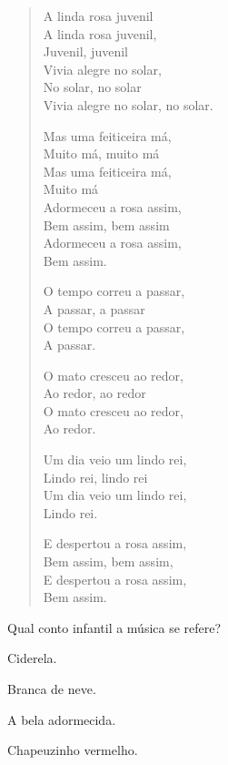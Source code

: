 \begin{verse}
A linda rosa juvenil\\
A linda rosa juvenil,\\
Juvenil, juvenil\\
Vivia alegre no solar,\\
No solar, no solar\\
Vivia alegre no solar, no solar.

Mas uma feiticeira má,\\
Muito má, muito má\\
Mas uma feiticeira má,\\
Muito má\\
Adormeceu a rosa assim,\\
Bem assim, bem assim\\
Adormeceu a rosa assim,\\
Bem assim.

O tempo correu a passar,\\
A passar, a passar\\
O tempo correu a passar,\\
A passar.

O mato cresceu ao redor,\\
Ao redor, ao redor\\
O mato cresceu ao redor,\\
Ao redor.

Um dia veio um lindo rei,\\
Lindo rei, lindo rei\\
Um dia veio um lindo rei,\\
Lindo rei.

E despertou a rosa assim,\\
Bem assim, bem assim,\\
E despertou a rosa assim,\\
Bem assim.
\end{verse}


Qual conto infantil a música se refere?

\begin{escolha}
\item Ciderela.

\item Branca de neve.

\item A bela adormecida.

\item Chapeuzinho vermelho.
\end{escolha}

